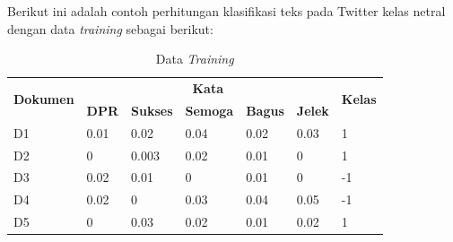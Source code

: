 \begin{adjustbox}{width=1\textwidth}
\begin{minipage}{\linewidth}
\end{minipage}
\end{adjustbox}

\noindent Berikut ini adalah contoh perhitungan klasifikasi teks pada Twitter kelas netral dengan data \textit{training} sebagai berikut:
\begin{table}[H]
	\caption{Data \textit{Training}}
	\centering
	\small
	\begin{adjustbox}{width=1\textwidth}
	\begin{tabular}{|p{2.5cm}|p{1.5cm}|p{1.5cm}|p{1.5cm}|p{1.5cm}|p{1.5cm}|p{1cm}|}
		\hline
		\multirow{2}{*}{\textbf{Dokumen}} & \multicolumn{5}{c|}{\textbf{Kata}}& \multirow{2}{*}{\textbf{Kelas}}\\
		\cline{2-6}
		& \textbf{DPR} & \textbf{Sukses} & \textbf{Semoga} & \textbf{Bagus} & \textbf{Jelek} & \\
		\hline
		D1 & 0.01 & 0.02 & 0.04 & 0.02 & 0.03 & 1 \\
		\hline
		D2 & 0 & 0.003 & 0.02 & 0.01 & 0 & 1 \\
		\hline
		D3 & 0.02 & 0.01 & 0 & 0.01 & 0 & -1 \\
		\hline
		D4 & 0.02 & 0 & 0.03 & 0.04 & 0.05 & -1 \\
		\hline
		D5 & 0 & 0.03 & 0.02 & 0.01 & 0.02 & 1 \\
		\hline
	\end{tabular}
	\end{adjustbox}
\end{table}

